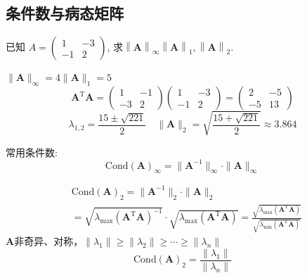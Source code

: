 \subsection{条件数与病态矩阵}
\begin{example}
    已知 $A=\begin{pmatrix}1&-3\\-1&2\end{pmatrix}$, 求$\left\|\boldsymbol{A}\right\|_\infty\left\|\boldsymbol{A}\right\|_1,\left\|\boldsymbol{A}\right\|_2.$
    \begin{solution}
        $\| \boldsymbol{A}\|_{\infty }= 4\| \boldsymbol{A}\|_1= 5$
        \[
            \boldsymbol{A}^\mathrm{T}\boldsymbol{A}=
                \begin{pmatrix}1&-1\\-3&2\end{pmatrix}
                \begin{pmatrix}1&-3\\-1&2\end{pmatrix}
                =\begin{pmatrix}2&-5\\-5&13\end{pmatrix}
        \]
        \[
            \lambda_{1,2}=\frac{15\pm\sqrt{221}}2\quad
            \|\boldsymbol{A}\|_2=\sqrt{\frac{15+\sqrt{221}}2}\approx3.864
        \]
    \end{solution}
\end{example}
\begin{note}
    常用条件数:
    \[
        \mathrm{Cond}(\boldsymbol{A})_{\infty}= \|\boldsymbol{A}^{-1}\|_{\infty}\cdot \| \boldsymbol{A}\|_{\infty}
    \]

    \[
        \begin{aligned}
            &\mathrm{Cond}(\boldsymbol{A})_{2}= \| \boldsymbol{A}^{- 1}\|_{2}\cdot \| \boldsymbol{A}\| _{2} \\
            &= \sqrt{\lambda_{\max}\left(\boldsymbol{A}^{\mathrm{T}}\boldsymbol{A}\right)^{-1}}\cdot\sqrt{\lambda_{\max}\left(\boldsymbol{A}^{\mathrm{T}}\boldsymbol{A}\right)}=\frac{\sqrt{\lambda_{\max}\left(\boldsymbol{A}^{\mathrm{T}}\boldsymbol{A}\right)}}{\sqrt{\lambda_{\min}\left(\boldsymbol{A}^{\mathrm{T}}\boldsymbol{A}\right)}}
        \end{aligned}
    \]
    $\boldsymbol{A}$非奇异、对称，$\|\lambda_1\|\geq\|\lambda_2\|\geq\cdots\geq\|\lambda_n\|$
    \[
        \mathrm{Cond}(\boldsymbol{A})_2=\frac{\|\lambda_1\|}{\|\lambda_n\|}
    \]
\end{note}
